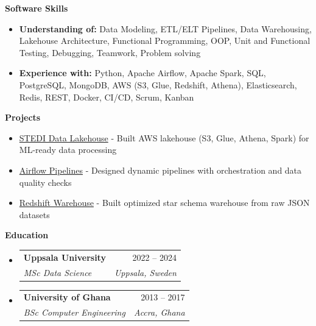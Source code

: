 \documentclass[a4paper,12pt]{article}[leftmargin=*]
\makeatletter
\def \entryspacing {-0pt}
\renewcommand{\section}[2]{\vspace{5pt}
  \colorbox{secondary}{\color{white}\raggedbottom\normalsize\textbf{{#1}{\hspace{7pt}#2}}}
}
\newcommand{\resumeEntryStart}{\begin{itemize}[leftmargin=2.5mm]}
\newcommand{\resumeEntryEnd}{\end{itemize}\vspace{\entryspacing}}
\newcommand{\resumeEntryTSDL}[4]{
  \vspace{-1pt}\item[]
    \begin{tabularx}{0.99\textwidth}{X@{\hspace{60pt}}r}
      \textbf{\color{primary}#1} & {\firabook\color{accent}\small#2} \\
      \textit{\color{accent}\small#3} & \textit{\color{accent}\small#4} \\
    \end{tabularx}\vspace{-7pt}
}
\newcommand{\resumeEntryS}[2]{
  \item[]\small{
    \textbf{\color{primary}#1 }{ #2 \vspace{-6pt}}
  }
}
\makeatother
\begin{document}
\section{\faGears} {Software Skills}
 \resumeEntryStart
  \resumeEntryS
    {Understanding of:}
    {Data Modeling, ETL/ELT Pipelines, Data Warehousing, Lakehouse Architecture, Functional Programming, OOP, Unit and Functional Testing, Debugging, Teamwork, Problem solving}

  \resumeEntryS
    {Experience with:}
    {\color{black} Python, Apache Airflow, Apache Spark, SQL, PostgreSQL, MongoDB, AWS (S3, Glue, Redshift, Athena), Elasticsearch, Redis, REST,  Docker, CI/CD, Scrum, Kanban}
 \resumeEntryEnd


\vspace{2pt}
\section{\faGears} {Projects}
 \resumeEntryStart
  \resumeEntryS
    {}
    {
        {\href{https://github.com/Dna072/stedi-human-balance-analytics}{STEDI Data Lakehouse}} - {Built AWS lakehouse (S3, Glue, Athena, Spark) for ML-ready data processing}
    }
  \resumeEntryS
  {}
   {
        {\href{https://github.com/Dna072/airflow-pipelines}{Airflow Pipelines}} - {Designed dynamic pipelines with orchestration and data quality checks}
    }
   \resumeEntryS
    {}
      {
        {\href{https://github.com/Dna072/sparkify_dwh_aws_redshift}{Redshift Warehouse}} - {Built optimized star schema warehouse from raw JSON datasets}
    }
 \resumeEntryEnd


\vspace{2pt}
\section{\faGraduationCap}{Education}
  \resumeEntryStart
    \vspace{-10pt}
    \resumeEntryTSDL
      {Uppsala University}{2022 -- 2024}
      {MSc Data Science}
      {Uppsala, Sweden}
  \resumeEntryEnd
  \resumeEntryStart
    \vspace{-10pt}
    \resumeEntryTSDL
      {University of Ghana}{2013 -- 2017}
      {BSc Computer Engineering}
      {Accra, Ghana}
  \resumeEntryEnd
\end{document}
